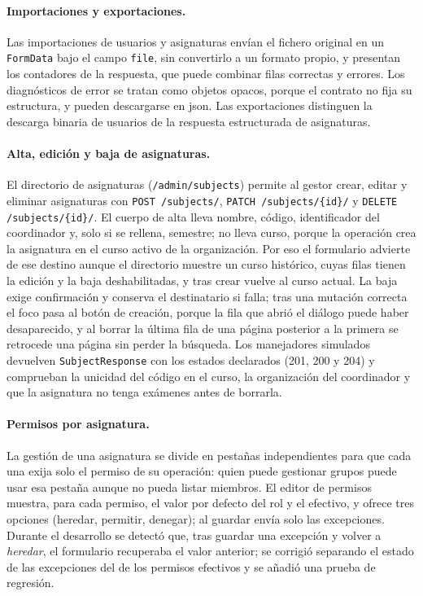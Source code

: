 \paragraph{Importaciones y exportaciones.} Las importaciones de usuarios y asignaturas
envían el fichero original en un \texttt{FormData} bajo el campo \texttt{file}, sin
convertirlo a un formato propio, y presentan los contadores de la respuesta, que puede
combinar filas correctas y errores. Los diagnósticos de error se tratan como objetos opacos,
porque el contrato no fija su estructura, y pueden descargarse en \acs{json}. Las
exportaciones distinguen la descarga binaria de usuarios de la respuesta estructurada de
asignaturas.

\paragraph{Alta, edición y baja de asignaturas.} El directorio de asignaturas
(\texttt{/admin/subjects}) permite al gestor crear, editar y eliminar asignaturas con
\texttt{POST /subjects/}, \texttt{PATCH /subjects/\{id\}/} y \texttt{DELETE /subjects/\{id\}/}.
El cuerpo de alta lleva nombre, código, identificador del coordinador y, solo si se rellena,
semestre; no lleva curso, porque la operación crea la asignatura en el curso activo de la
organización. Por eso el formulario advierte de ese destino aunque el directorio muestre un
curso histórico, cuyas filas tienen la edición y la baja deshabilitadas, y tras crear vuelve
al curso actual. La baja exige confirmación y conserva el destinatario si falla; tras una
mutación correcta el foco pasa al botón de creación, porque la fila que abrió el diálogo
puede haber desaparecido, y al borrar la última fila de una página posterior a la primera se
retrocede una página sin perder la búsqueda. Los manejadores simulados devuelven
\texttt{SubjectResponse} con los estados declarados (201, 200 y 204) y comprueban la unicidad
del código en el curso, la organización del coordinador y que la asignatura no tenga
exámenes antes de borrarla.

\paragraph{Permisos por asignatura.} La gestión de una asignatura se divide en pestañas
independientes para que cada una exija solo el permiso de su operación: quien puede
gestionar grupos puede usar esa pestaña aunque no pueda listar miembros. El editor de
permisos muestra, para cada permiso, el valor por defecto del rol y el efectivo, y ofrece
tres opciones (heredar, permitir, denegar); al guardar envía solo las excepciones. Durante el
desarrollo se detectó que, tras guardar una excepción y volver a \emph{heredar}, el
formulario recuperaba el valor anterior; se corrigió separando el estado de las excepciones
del de los permisos efectivos y se añadió una prueba de regresión.

